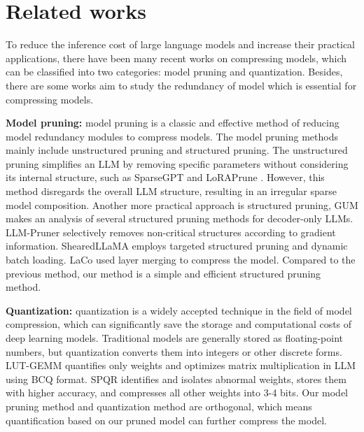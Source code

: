 		
		
		\section{Related works}
		To reduce the inference cost of large language models and increase their practical applications, there have been many recent works on compressing models, which can be classified into two categories:
		model pruning and quantization. Besides, there are some works aim to study the redundancy of model which is essential for compressing models.
		
		\textbf{Model pruning:} model pruning \citep{lecun1989optimal,han2015learning} is a classic and effective method of reducing model redundancy modules to compress models. The model pruning methods mainly include unstructured pruning and structured pruning. The unstructured pruning simplifies an LLM by removing specific parameters without considering its internal structure, such as SparseGPT \citep{frantar2023massive} and LoRAPrune \citep{zhang2023pruning}. However, this method disregards the overall LLM structure, resulting in an irregular sparse model composition. Another more practical approach is structured pruning, GUM\citep{syed2023prune} makes an analysis of several structured pruning methods for decoder-only LLMs. LLM-Pruner \citep{ma2024llm}  selectively removes non-critical structures according to gradient information. ShearedLLaMA \citep{xia2023sheared} employs targeted structured pruning and dynamic batch loading. LaCo \citep{yang2024laco} used layer merging to compress the model. Compared to the previous method, our method is a simple and efficient structured pruning method.
		
		
		\textbf{Quantization:} quantization \citep{liu2021post,gholami2022survey,dettmers2022llm,dettmers2024qlora} is a widely accepted technique in the field of model compression, which can significantly save the storage and computational costs of deep learning models. Traditional models are generally stored as floating-point numbers, but quantization converts them into integers or other discrete forms. LUT-GEMM \citep{park2022nuqmm} quantifies only weights and optimizes matrix multiplication in LLM using BCQ format. SPQR \citep{dettmers2023spqr}  identifies and isolates abnormal weights, stores them with higher accuracy, and compresses all other weights into 3-4 bits. Our model pruning method and quantization method are orthogonal, which means quantification based on our pruned model can further compress the model.
		

